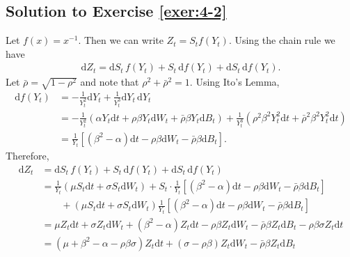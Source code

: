 \documentclass[12pt]{book}
\numberwithin{equation}{chapter}
\theoremstyle{plain}
\numberwithin{theorem}{section}
\theoremstyle{definition}
\numberwithin{exercise}{chapter}
\newcommand{\<}{\langle}
\renewcommand{\>}{\rangle}
\renewcommand{\(}{\left(}
\renewcommand{\)}{\right)}
\renewcommand{\[}{\left[}
\renewcommand{\]}{\right]}
\newcommand\sig{\sigma}
\newcommand\dd{\mathrm{d}}
\theoremstyle{definition}
\numberwithin{question}{section}
\begin{document}
\subsection*{Solution to Exercise \ref{exer:4-2}}
Let $f(x) = x^{-1}$. Then we can write $Z_t = S_t f(Y_t)$. Using the chain rule we have
\begin{align}
\dd Z_t
	= \dd S_t\, f(Y_t) + S_t\, \dd f(Y_t) + \dd S_t\, \dd f(Y_t).
\end{align}
Let $\bar \rho = \sqrt{1 - \rho^2}$ and note that $\rho^2 + \bar \rho ^2 = 1$. Using Ito's Lemma,
\begin{align}
\dd f(Y_t)
	&= - \frac 1{Y_t^2} \dd Y_t + \frac 1{Y_t^3} \dd Y_t\, \dd Y_t \\
	&= - \frac 1{Y_t^2}\( \alpha Y_t \dd t + \rho \beta Y_t \dd W_t + \bar \rho \beta Y_t \dd B_t\) 
	  + \frac{1}{Y_t^3} \( \rho^2 \beta^2 Y_t^2 \dd t + \bar \rho^2 \beta^2 Y_t^2 \dd t\) \\
	&= \frac 1{Y_t} \[ ( \beta^2 - \alpha) \dd t - \rho \beta \dd W_t - \bar \rho \beta \dd B_t\].
\end{align}
Therefore,
\begin{align}
\dd Z_t
	&= \dd S_t\, f(Y_t) + S_t\, \dd f(Y_t) + \dd S_t\, \dd f(Y_t) \\
	&= \frac 1{Y_t}\( \mu S_t \dd t + \sig S_t \dd W_t\) + S_t\cdot \frac 1{Y_t} \[ ( \beta^2 - \alpha) \dd t - \rho \beta \dd W_t - \bar \rho \beta \dd B_t\] \\ &\qquad
		+ \( \mu S_t \dd t + \sig S_t \dd W_t\) \frac 1{Y_t} \[ ( \beta^2 - \alpha) \dd t - \rho \beta \dd W_t - \bar \rho \beta \dd B_t\] \\
	&= \mu Z_t \dd t + \sig Z_t \dd W_t + \(\beta^2 - \alpha\)  Z_t\dd t 
		- \rho \beta Z_t \dd W_t- \bar \rho \beta Z_t \dd B_t - \rho \beta \sig Z_t \dd t \\
	&= \( \mu + \beta^2 - \alpha - \rho \beta \sig\) Z_t \dd t + ( \sig - \rho \beta) Z_t \dd W_t- \bar \rho \beta Z_t \dd B_t
\end{align}


\end{document}
